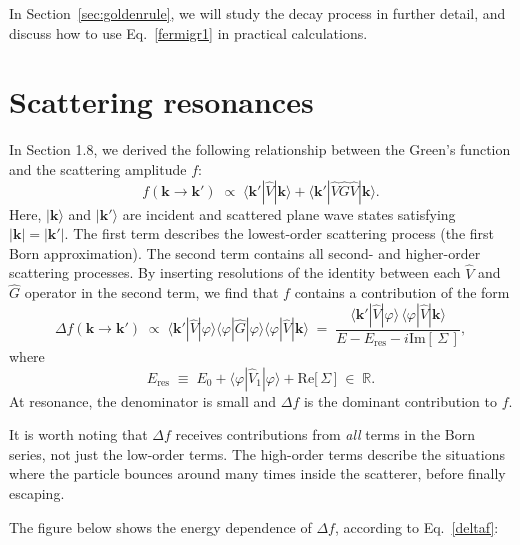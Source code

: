 \documentclass[pra,12pt]{revtex4}
\begin{document}
In Section~\ref{sec:goldenrule}, we will study the decay process in
further detail, and discuss how to use Eq.~\eqref{fermigr1} in
practical calculations.

\section{Scattering resonances}
\label{sec:scattering_resonances}

In Section 1.8, we derived the following relationship between the
Green's function and the scattering amplitude $f$:
\begin{equation}
  f(\mathbf{k}\rightarrow\mathbf{k}') \;\propto\; \langle \mathbf{k}'|\hat{V}|\mathbf{k}\rangle + \langle \mathbf{k}'|\hat{V}\hat{G}\hat{V}|\mathbf{k}\rangle.
\end{equation}
Here, $|\mathbf{k}\rangle$ and $|\mathbf{k}'\rangle$ are incident and
scattered plane wave states satisfying $|\mathbf{k}|=|\mathbf{k}'|$.
The first term describes the lowest-order scattering process (the
first Born approximation).  The second term contains all second- and
higher-order scattering processes.  By inserting resolutions of the
identity between each $\hat{V}$ and $\hat{G}$ operator in the second
term, we find that $f$ contains a contribution of the form
\begin{equation}
  \Delta f(\mathbf{k}\rightarrow\mathbf{k}') \;\propto\; \langle \mathbf{k}'|\hat{V}|\varphi\rangle\langle\varphi|\hat{G}|\varphi\rangle\langle\varphi|\hat{V}|\mathbf{k}\rangle \;=\; \frac{\langle \mathbf{k}'|\hat{V}|\varphi\rangle \, \langle\varphi|\hat{V}|\mathbf{k}\rangle}{\displaystyle E - E_{\mathrm{res}} - i \mathrm{Im}[\,\Sigma\,]},
  \label{deltaf}
\end{equation}
where
\begin{equation}
  E_{\mathrm{res}} \;\equiv\; E_0 + \langle\varphi|\hat{V}_1|\varphi\rangle + \mathrm{Re}\big[\,\Sigma\,\big] \;\in\; \mathbb{R}.
  \label{Eres}
\end{equation}
At resonance, the denominator is small and $\Delta f$ is the dominant
contribution to $f$.

It is worth noting that $\Delta f$ receives contributions from
\textit{all} terms in the Born series, not just the low-order terms.
The high-order terms describe the situations where the particle
bounces around many times inside the scatterer, before finally
escaping.

The figure below shows the energy dependence of $\Delta f$, according
to Eq.~\eqref{deltaf}:
\end{document}

